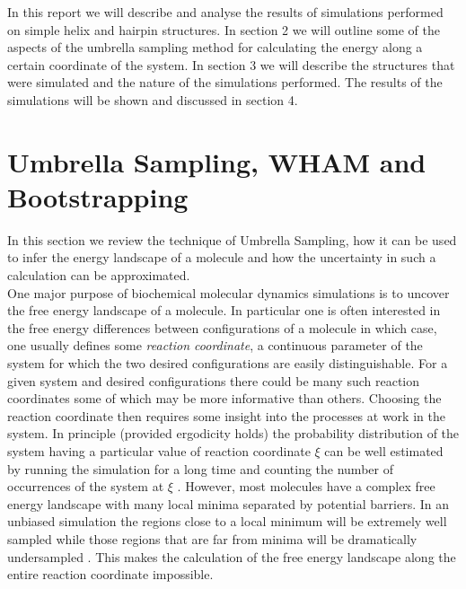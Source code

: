 \documentclass[12pt, onecolumn]{revtex4}    %
\begin{document}
In this report we will describe and analyse the results of simulations performed on simple helix and hairpin structures.  In section 2 we will outline some of the aspects of the umbrella sampling method for calculating the energy along a certain coordinate of the system.  In section 3 we will describe the structures that were simulated and the nature of the simulations performed.  The results of the simulations will be shown and discussed in section 4.   

\section{Umbrella Sampling, WHAM and Bootstrapping}

In this section we review the technique of Umbrella Sampling, how it can be used to infer the energy landscape of a molecule and how the uncertainty in such a calculation can be approximated.\\

One major purpose of biochemical molecular dynamics simulations is to uncover the free energy landscape of a molecule\cite{Umbrella}.  In particular one is often interested in the free energy differences between configurations of a molecule in which case, one usually defines some \textit{reaction coordinate}, a continuous parameter of the system for which the two desired configurations are easily distinguishable\cite{Umbrella}.  For a given system and desired configurations there could be many such reaction coordinates some of which may be more informative than others.  Choosing the reaction coordinate then requires some insight into the processes at work in the system\cite{Umbrella}.  In principle (provided ergodicity holds) the probability distribution of the system having a particular value of reaction coordinate $\xi$ can be well estimated by running the simulation for a long time and counting the number of occurrences of the system at $\xi$ \cite{GWHAM}.  However, most molecules have a complex free energy landscape with many local minima separated by potential barriers.  In an unbiased simulation the regions close to a local minimum will be extremely well sampled while those regions that are far from minima will be dramatically undersampled\cite{Umbrella} \cite{GWHAM}.  This makes the calculation of the free energy landscape along the entire reaction coordinate impossible.\\
\end{document}
